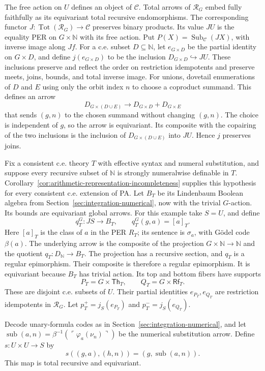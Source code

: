 \documentclass[11pt]{article}
\theoremstyle{definition}
\theoremstyle{remark}
\begin{document}
The free action on $U$ defines an object of $\mathcal C$.
Total arrows of $\mathcal R_G$ embed fully faithfully as its
equivariant total recursive endomorphisms.  The corresponding
functor $J:\operatorname{Tot}(\mathcal R_G)\to\mathcal C$
preserves binary products. Its value $JU$ is the equality PER on
$G\times\mathbb N$ with its free action. Put
$P(X)=\operatorname{Sub}_{\mathcal C}(JX)$, with inverse image
along $Jf$. For a c.e. subset $D\subseteq\mathbb N$, let
$e_{G\times D}$ be the partial identity on $G\times D$, and define
$j(e_{G\times D})$ to be the inclusion
$D_{G\times D}\hookrightarrow JU$.
These inclusions preserve and reflect the order on restriction
idempotents and preserve meets, joins, bounds, and total inverse
image.  For unions, dovetail enumerations of $D$ and $E$ using
only the orbit index $n$ to choose a coproduct summand. This defines an arrow
\[
 D_{G\times(D\cup E)}\longrightarrow D_{G\times D}+D_{G\times E}
\]
that sends $(g,n)$ to the chosen summand without changing $(g,n)$.
The choice is independent of $g$, so the arrow is equivariant.
Its composite with the copairing of the two inclusions is the inclusion of
$D_{G\times(D\cup E)}$ into $JU$. Hence $j$ preserves joins.

Fix a consistent c.e. theory $T$ with effective syntax and
numeral substitution, and suppose every recursive subset of
$\mathbb N$ is strongly numeralwise definable in $T$.
Corollary~\ref{cor:arithmetic-representation-incompleteness} supplies this
hypothesis for every consistent c.e. extension of PA.
Let $B_T$ be its Lindenbaum Boolean algebra from
Section~\ref{sec:integration-numerical}, now with the trivial
$G$-action. Its bounds are equivariant global arrows.
For this example take $S=U$, and define
\[
 q_T^G:JS\longrightarrow B_T,
 \qquad q_T^G(g,a)=[a]_T.
\]
Here $[a]_T$ is the class of $a$ in the PER $R_T$;
its sentence is $\sigma_a$, with G\"odel code $\beta(a)$.
The underlying arrow is the composite of the projection
$G\times\mathbb N\to\mathbb N$ and the quotient
$q_T:D_{\mathbb N}\to B_T$.
The projection has a recursive section, and $q_T$ is a
regular epimorphism. Their composite is therefore a regular
epimorphism. It is equivariant because $B_T$ has trivial action.
Its top and bottom fibers have supports
\[
 P_T=G\times\mathsf{Th}_T,\qquad
 Q_T=G\times\mathsf{Rf}_T.
\]
These are disjoint c.e. subsets of $U$. Their partial identities
$e_{P_T},e_{Q_T}$ are restriction idempotents in $\mathcal R_G$.
Let $p_T^+=j_S(e_{P_T})$ and $p_T^-=j_S(e_{Q_T})$.

Decode unary-formula codes as in
Section~\ref{sec:integration-numerical}, and let
$\operatorname{sub}(a,n)=\beta^{-1}(\ulcorner\varphi_a(\nu_n)\urcorner)$
be the numerical substitution arrow. Define $s:U\times U\to S$ by
\[
 s((g,a),(h,n))=(g,\operatorname{sub}(a,n)).
\]
This map is total recursive and equivariant.
\end{document}
